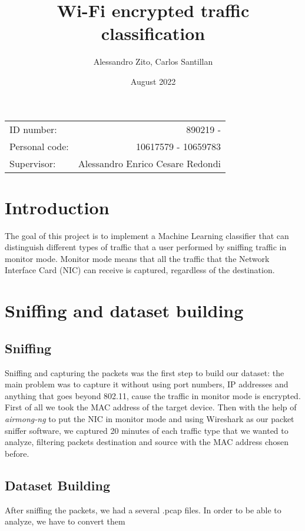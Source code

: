 \documentclass[11pt, USenglish]{article}
\title{Wi-Fi encrypted traffic classification}
\author{Alessandro Zito, Carlos Santillan}
\date{August 2022}
\begin{document}
\maketitle
\begin{center}
\begin{tabular}{l r}
ID number: & 890219 - \\ %
Personal code: & 10617579 - 10659783\\
Supervisor: & Alessandro Enrico Cesare Redondi %
\end{tabular}
\end{center}


\newpage

\tableofcontents

\newpage


\section{Introduction}
The goal of this project is to implement a Machine Learning classifier that can distinguish different types of traffic that a user performed by sniffing traffic in monitor mode. Monitor mode means that all the traffic that the Network Interface Card (NIC) can receive is captured, regardless of the destination. 

\section{Sniffing and dataset building}

\subsection{Sniffing}
Sniffing and capturing the packets was the first step to build our dataset: the main problem was to capture it without using port numbers, IP addresses and anything that goes beyond 802.11, cause the traffic in monitor mode is encrypted.
First of all we took the MAC address of the target device. Then with the help of \textit{airmong-ng} to put the NIC in monitor mode and using Wireshark as our packet sniffer software, we captured 20 minutes of each traffic type that we wanted to analyze, filtering packets destination and source with the MAC address chosen before.

\subsection{Dataset Building}
After sniffing the packets, we had a several .pcap files. In order to be able to analyze, we have to convert them 
\end{document}

